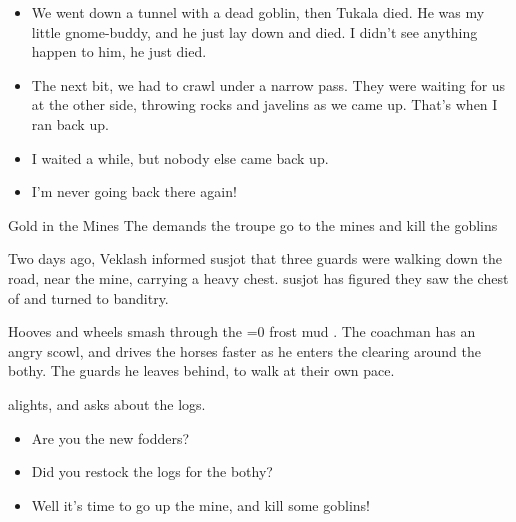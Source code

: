 \begin{multicols}{2}
\begin{speechtext}
\begin{itemize}
    \item
    We went down a tunnel with a dead goblin, then Tukala died.
    He was my little gnome-buddy, and he just lay down and died.
    I didn't see anything happen to him, he just died.
    
    \item
    The next bit, we had to crawl under a narrow pass.
    They were waiting for us at the other side, throwing rocks and javelins as we came up.
    That's when I ran back up.
    
    \item
    I waited a while, but nobody else came back up.
    \item
    I'm never going back there again!
  \end{itemize}
\end{speechtext}

{Gold in the Mines}%
{The  demands the troupe go to the mines and kill the goblins}%

\begin{exampletext}
  Two days ago, Veklash informed \gls{susjot} that three \glspl{guard} were walking down the road, near the mine, carrying a heavy chest.
  \Gls{susjot} has figured they saw the chest of  and turned to banditry.
\end{exampletext}

\begin{boxtext}
  Hooves and wheels smash through the
  \ifnum\value{temperature}=0%
    frost
  \else%
    mud
  \fi.
  The coachman has an angry scowl, and drives the horses faster as he enters the clearing around the \gls{bothy}.
  The \glspl{guard} he leaves behind, to walk at their own pace.
\end{boxtext}

 alights, and asks about the logs.

\begin{speechtext}
  \begin{itemize}
    \item
    Are you the new \glspl{fodder}?
    \item
    Did you restock the logs for the \gls{bothy}?
    \item
    Well it's time to go up the mine, and kill some goblins!
  \end{itemize}


\end{speechtext}
\end{multicols}
